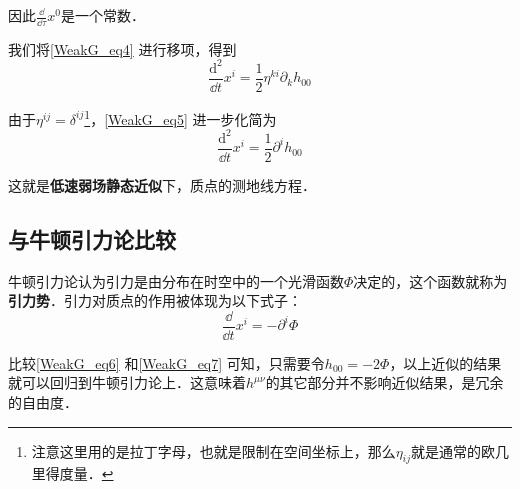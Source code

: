 因此$\frac{\dd}{\dd\tau}x^0$是一个常数．

我们将\autoref{WeakG_eq4} 进行移项，得到
\begin{equation}\label{WeakG_eq5}
\frac{\mathrm{d}^2}{\dd t}x^i=\frac{1}{2}\eta^{ki}\partial_kh_{00}
\end{equation}

由于$\eta^{ij}=\delta^{ij}$\footnote{注意这里用的是拉丁字母，也就是限制在空间坐标上，那么$\eta_{ij}$就是通常的欧几里得度量．}，\autoref{WeakG_eq5} 进一步化简为
\begin{equation}\label{WeakG_eq6}
\frac{\mathrm{d}^2}{\dd t}x^i=\frac{1}{2}\partial^ih_{00}
\end{equation}

这就是\textbf{低速弱场静态近似}下，质点的测地线方程．

\subsection{与牛顿引力论比较}

牛顿引力论认为引力是由分布在时空中的一个光滑函数$\Phi$决定的，这个函数就称为\textbf{引力势}．引力对质点的作用被体现为以下式子：
\begin{equation}\label{WeakG_eq7}
\frac{\dd}{\dd t}x^i=-\partial^i\Phi
\end{equation}

比较\autoref{WeakG_eq6} 和\autoref{WeakG_eq7} 可知，只需要令$h_{00}=-2\Phi$，以上近似的结果就可以回归到牛顿引力论上．这意味着$h^{\mu\nu}$的其它部分并不影响近似结果，是冗余的自由度．








